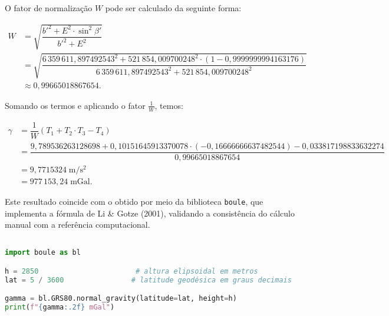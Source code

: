    





\noindent
O fator de normalização \(W\) pode ser calculado da seguinte forma:

\[
\begin{aligned}
   W &= \sqrt{\dfrac{b'^2 + E^2 \cdot \sin^2\beta'}{b'^2 + E^2}} \\
     &= \sqrt{\dfrac{6\,359\,611{,}897492543^2 + 521\,854{,}009700248^2 \cdot (1 - 0{,}9999999994163176)}{6\,359\,611{,}897492543^2 + 521\,854{,}009700248^2}} \\
     &\approx 0{,}99665018867654 \text{.}
\end{aligned}
\]


\noindent
Somando os termos e aplicando o fator \(\frac{1}{W}\), temos:

\[
\begin{aligned}
   \gamma &= \dfrac{1}{W} \left( T_1 + T_2 \cdot T_3 - T_4 \right) \\[6pt]
          &= \dfrac{ 9{,}789536263128698 + 0{,}10151645913370078 \cdot (-0{,}16666666637482544) - 0{,}033817198833632274}{0{,}99665018867654} \\
          &= 9{,}7715324\;\mathrm{m/s^2} \\
          &= 977\,153{,}24\;\mathrm{mGal} \text{.}
\end{aligned}
\]



\noindent
Este resultado coincide com o obtido por meio da biblioteca \texttt{boule}, que implementa a fórmula de Li \& Gotze (2001), validando a consistência do cálculo manual com a referência computacional.

\begin{lstlisting}[language=Python, caption={Cálculo da gravidade normal com a biblioteca \texttt{boule} 
para o modelo GRS80 (Valor obtido: 977153.24 mGal)}]

import boule as bl

h = 2850                       # altura elipsoidal em metros
lat = 5 / 3600                # latitude geodésica em graus decimais

gamma = bl.GRS80.normal_gravity(latitude=lat, height=h)
print(f"{gamma:.2f} mGal")
\end{lstlisting}


